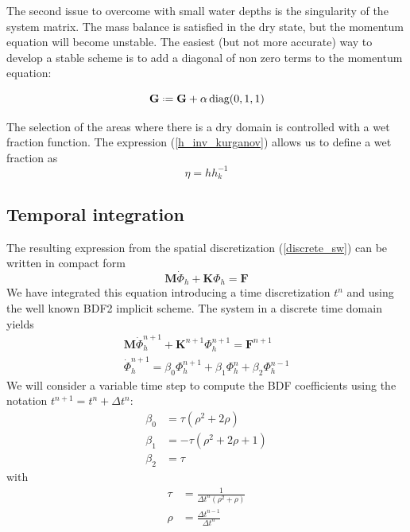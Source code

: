 \documentclass[a4paper,12pt]{article}
\newcommand{\defeq}{\mathrel{\vcenter{\baselineskip0.5ex\lineskiplimit0pt\hbox{\scriptsize.}\hbox{\scriptsize.}}}=}
\begin{document}
The second issue to overcome with small water depths is the singularity of the system matrix. The mass balance is satisfied in the dry state, but the momentum equation will become unstable. The easiest (but not more accurate) way to develop a stable scheme is to add a diagonal of non zero terms to the momentum equation:

\begin{equation}
\mathbf{G} \defeq \mathbf{G} + \alpha\,\text{diag}(0, 1, 1)
\end{equation}

The selection of the areas where there is a dry domain is controlled with a wet fraction function. The expression (\ref{h_inv_kurganov}) allows us to define a wet fraction as
\begin{equation}
\eta = hh^{-1}_k
\end{equation}


\subsection{Temporal integration}

The resulting expression from the spatial discretization (\ref{discrete_sw}) can be written in compact form 
\begin{equation} \label{discrete_compact}
\mathbf{M}\dot{\Phi}_h + \mathbf{K}\Phi_h = \mathbf{F}
\end{equation}
We have integrated this equation introducing a time discretization $t^n$ and using the well known BDF2 implicit scheme. The system in a discrete time domain yields
\begin{equation}
\begin{split} \label{discrete_bdf2}
\mathbf{M}\dot{\Phi}_h^{n+1} + \mathbf{K}^{n+1}\Phi_h^{n+1} = \mathbf{F}^{n+1} \\
\dot{\Phi}_h^{n+1} = \beta_0 \Phi_h^{n+1} + \beta_1 \Phi_h^n + \beta_2 \Phi_h^{n-1}
\end{split}
\end{equation}
We will consider a variable time step to compute the BDF coefficients using the notation $t^{n+1} = t^n + \Delta t^n$:
\begin{equation}
\begin{split}
\beta_0 &= \tau (\rho^2 + 2\rho) \\
\beta_1 &= -\tau (\rho^2 + 2\rho + 1) \\
\beta_2 &= \tau
\end{split}
\end{equation}
with
\begin{equation}
\begin{split}
\tau &= \frac{1}{\Delta t^n(\rho^2 + \rho)} \\
\rho &= \frac{\Delta t^{n-1}}{\Delta t^n}
\end{split}
\end{equation}
\end{document}
